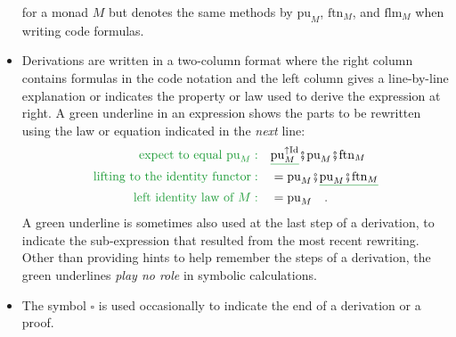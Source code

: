 \begin{itemize}
for a monad $M$ but denotes the same methods by $\text{pu}_{M}$,
$\text{ftn}_{M}$, and $\text{flm}_{M}$ when writing code formulas.
\item Derivations are written in a two-column format where the right column
contains formulas in the code notation and the left column gives a
line-by-line explanation or indicates the property or law used to
derive the expression at right. A green underline in an expression
shows the parts to be rewritten using the law or equation indicated
in the \emph{next} line:
\begin{align*}
{\color{greenunder}\text{expect to equal }\text{pu}_{M}:}\quad & \gunderline{\text{pu}_{M}^{\uparrow\text{Id}}}\bef\text{pu}_{M}\bef\text{ftn}_{M}\\
{\color{greenunder}\text{lifting to the identity functor}:}\quad & =\text{pu}_{M}\bef\gunderline{\text{pu}_{M}\bef\text{ftn}_{M}}\\
{\color{greenunder}\text{left identity law of }M:}\quad & =\text{pu}_{M}\quad.
\end{align*}
A green underline is sometimes also used at the last step of a derivation,
to indicate the sub-expression that resulted from the most recent
rewriting. Other than providing hints to help  remember the steps
of a derivation, the green underlines \emph{play no role} in symbolic
calculations.
\item The symbol $\square$ is used occasionally to indicate the end of
a derivation or a proof.
\end{itemize}

